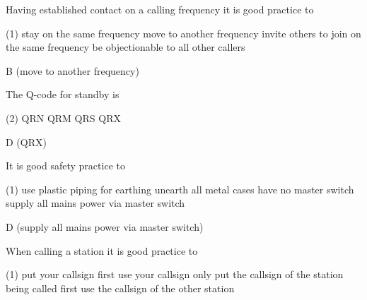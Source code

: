 \documentclass[a4paper]{article}
\begin{document}
\begin{question}Having established contact on a calling frequency it is good practice to
	\begin{tasks}(1)
		\task stay on the same frequency
		\task move to another frequency
		\task invite others to join on the same frequency
		\task be objectionable to all other callers
	\end{tasks}
\end{question}

\begin{solution}
	B (move to another frequency)
\end{solution}

\vspace{5mm}



\begin{question}The Q-code for \apostrophe{}standby\apostrophe{} is
	\begin{tasks}(2)
		\task QRN
		\task QRM
		\task QRS
		\task QRX
	\end{tasks}
\end{question}

\begin{solution}
	D (QRX)
\end{solution}

\vspace{5mm}



\begin{question}It is good safety practice to
	\begin{tasks}(1)
		\task use plastic piping for earthing
		\task unearth all metal cases
		\task have no master switch
		\task supply all mains power via master switch
	\end{tasks}
\end{question}

\begin{solution}
	D (supply all mains power via master switch)
\end{solution}

\vspace{5mm}



\begin{question}When calling a station it is good practice to
	\begin{tasks}(1)
		\task put your callsign first
		\task use your callsign only
		\task put the callsign of the station being called first
		\task use the callsign of the other station
	\end{tasks}
\end{question}
\end{document}
